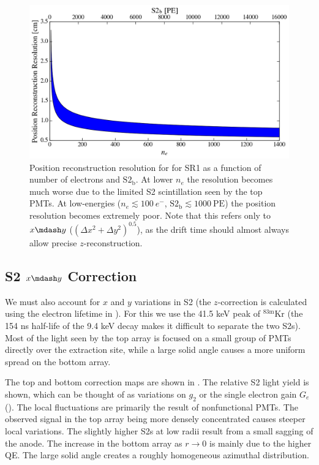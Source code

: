 {\begin{figure}
\centering
\includegraphics[width=\textwidth]{PosRecRes}
\caption{Position reconstruction resolution for for SR1 as a function of number of electrons and $\mathrm{S2_b}$.  At lower $n_e$ the
resolution becomes much worse due to the limited S2 scintillation seen by the top PMTs.  At low-energies ($n_e \lesssim 100\ e^-$,
$\mathrm{S2_b} \lesssim 1000\ \mathrm{PE}$) the position resolution becomes extremely poor.  Note that this refers only to $x \mdash y$
($(\Delta x^2 + \Delta y^2)^{0.5}$), as the drift time should almost always allow precise $z$-reconstruction.}
\label{fig:calibrations_position_reconstruction_res}
\end{figure}



\subsection{S2 $x \mdash y$ Correction}
\label{subsec:det_char_s2_position_correction}
We must also account for $x$ and $y$ variations in S2 (the $z$-correction is calculated using the electron lifetime in
).  For
this we use the 41.5 keV peak of $\mathrm{^{83m}Kr}$ (the 154 ns half-life of the 9.4 keV decay makes it difficult to separate the two
S2s).  Most of the light seen by the top array is focused on a small group of PMTs directly over the extraction site, while a large
solid angle causes a more uniform spread on the bottom array.

The top and bottom correction maps are shown in .  The relative S2 light yield is shown, which can be
thought of as variations on $g_2$ or the single electron gain $G_e$ ().  The local
fluctuations are primarily the result
of nonfunctional PMTs.  The observed signal in the top array being more densely concentrated causes steeper local variations.  The
slightly higher S2s at low radii result from a small sagging of the anode.  The increase in the bottom array as $r \rightarrow 0$ is 
mainly due to the higher QE.  The large solid angle creates a roughly homogeneous azimuthal distribution.

}

